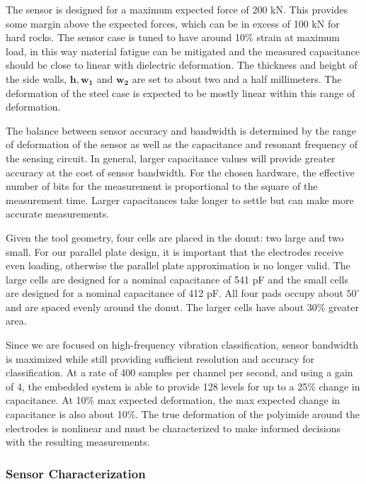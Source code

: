 The sensor is designed for a maximum expected force of 200 kN. 
This provides some margin above the expected forces, which can be in excess of 100 kN for hard rocks.
The sensor case is tuned to have around 10\% strain at maximum load, in this way material fatigue can be 
 mitigated and the measured capacitance should be close to linear with dielectric deformation.
The thickness and height of the side walls, $\mathbf{h}, \mathbf{w_1}$ and $\mathbf{w_2}$
 are set to about two and a half millimeters.
The deformation of the steel case is expected to be mostly linear within this range of deformation.

The balance between sensor accuracy and bandwidth is determined by the range of deformation of the sensor
 as well as the capacitance and resonant frequency of the sensing circuit.
In general, larger capacitance values will provide greater accuracy at the cost of sensor bandwidth.
For the chosen hardware, the effective number of bits for the measurement 
 is proportional to the square of the measurement time. 
Larger capacitances take longer to settle but can make more accurate measurements.

Given the tool geometry, four cells are placed in the donut: two large and two small.
For our parallel plate design, it is important that the electrodes receive even loading,
 otherwise the parallel plate approximation is no longer valid.
The large cells are designed for a nominal capacitance of 541 pF and 
 the small cells are designed for a nominal capacitance of 412 pF.
All four pads occupy about $50^\circ$ and are spaced evenly around the donut.
The larger cells have about 30\% greater area.

Since we are focused on high-frequency vibration classification, 
 sensor bandwidth is maximized while still 
 providing sufficient resolution and accuracy for classification.
At a rate of 400 samples per channel per second, and using a gain of 4, 
 the embedded system is able to provide 128 levels for up to a 25\% change in capacitance.
At 10\% max expected deformation, the max expected change in capacitance is also about 10\%.
The true deformation of the polyimide around the electrodes is nonlinear and must be characterized to 
 make informed decisions with the resulting measurements.
 

\subsubsection{Sensor Characterization}

